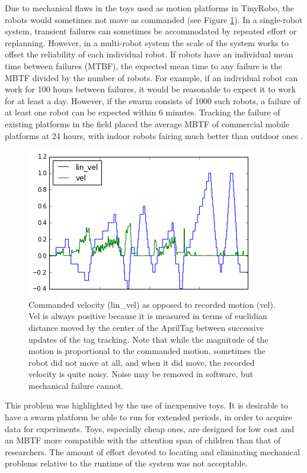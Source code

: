 Due to mechanical flaws in the toys used as motion platforms in TinyRobo, the robots would sometimes not move as commanded (see Figure \ref{motor-speed-fig}). 
In a single-robot system, transient failures can sometimes be accommodated by repeated effort or replanning. 
However, in a multi-robot system the scale of the system works to offset the reliability of each individual robot. 
If robots have an individual mean time between failures (MTBF), the expected mean time to any failure is the MBTF divided by the number of robots. 
For example, if an individual robot can work for 100 hours between failures, it would be reasonable to expect it to work for at least a day. 
However, if the swarm consists of 1000 such robots, a failure of at least one robot can be expected within 6 minutes. 
Tracking the failure of existing platforms in the field placed the average MBTF of commercial mobile platforms at 24 hours, with indoor robots fairing much better than outdoor ones \citep{carlson2004follow}.


\begin{figure}[t]
	\includegraphics{motion_vs_cmd}
	\centering
	\caption{Commanded velocity (lin\_vel) as opposed to recorded motion (vel). Vel is always positive because it is measured in terms of euclidian distance moved by the center of the AprilTag between successive updates of the tag tracking. 
		Note that while the magnitude of the motion is proportional to the commanded motion, sometimes the robot did not move at all, and when it did move, the recorded velocity is quite noisy. Noise may be removed in software, but mechanical failure cannot.} 
	\label{motor-speed-fig}
\end{figure}

This problem was highlighted by the use of inexpensive toys. 
It is desirable to have a swarm platform be able to run for extended periods, in order to acquire data for experiments. 
Toys, especially cheap ones, are designed for low cost and an MBTF more compatible with the attention span of children than that of researchers. 
The amount of effort devoted to locating and eliminating mechanical problems relative to the runtime of the system was not acceptable.

